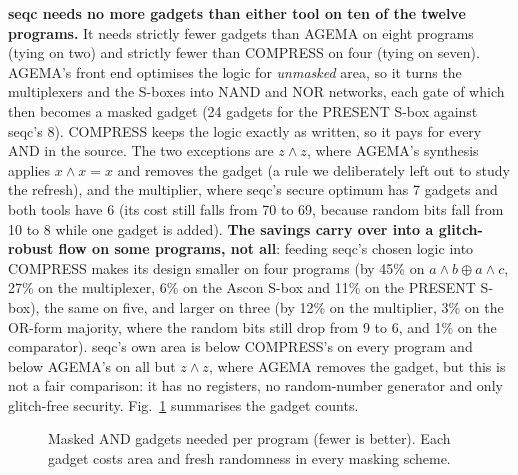 \documentclass[conference]{IEEEtran}
\begin{document}
\textbf{seqc needs no more gadgets than either tool on ten of the twelve programs.} It needs strictly fewer gadgets than AGEMA on eight programs (tying on two) and strictly fewer than COMPRESS on four (tying on seven). AGEMA's front end optimises the logic for \emph{unmasked} area, so it turns the multiplexers and the S-boxes into NAND and NOR networks, each gate of which then becomes a masked gadget (24 gadgets for the PRESENT S-box against seqc's 8). COMPRESS keeps the logic exactly as written, so it pays for every AND in the source. The two exceptions are $z\wedge z$, where AGEMA's synthesis applies $x\wedge x=x$ and removes the gadget (a rule we deliberately left out to study the refresh), and the multiplier, where seqc's secure optimum has 7 gadgets and both tools have 6 (its cost still falls from 70 to 69, because random bits fall from 10 to 8 while one gadget is added). \textbf{The savings carry over into a glitch-robust flow on some programs, not all}: feeding seqc's chosen logic into COMPRESS makes its design smaller on four programs (by 45\% on $a\wedge b\oplus a\wedge c$, 27\% on the multiplexer, 6\% on the Ascon S-box and 11\% on the PRESENT S-box), the same on five, and larger on three (by 12\% on the multiplier, 3\% on the OR-form majority, where the random bits still drop from 9 to 6, and 1\% on the comparator). seqc's own area is below COMPRESS's on every program and below AGEMA's on all but $z\wedge z$, where AGEMA removes the gadget, but this is not a fair comparison: it has no registers, no random-number generator and only glitch-free security. Fig.~\ref{fig:h2h} summarises the gadget counts.

\begin{figure}[t]
\centering
{}
\caption{Masked AND gadgets needed per program (fewer is better). Each gadget costs area and fresh randomness in every masking scheme.}
\label{fig:h2h}
\end{figure}
\end{document}
